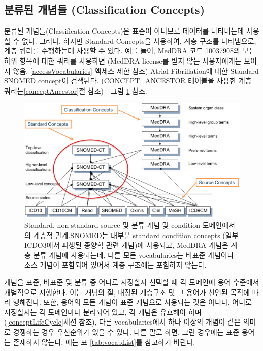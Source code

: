 \documentclass[11pt]{book}
\theoremstyle{definition}
\theoremstyle{definition}
\theoremstyle{definition}
\theoremstyle{remark}
\begin{document}
\subsection{분류된 개념들 (Classification
Concepts)}\label{--classification-concepts}

분류된 개념들(Classification Concepts)은 표준이 아니므로 데이터를
나타내는데 사용할 수 없다. 그러나, 하지만 Standard Concepts을 사용하여,
계층 구조를 나타냄으로, 계층 쿼리를 수행하는데 사용할 수 있다. 예를
들어, MedDRA 코드 10037908의 모든 하위 항목에 대한 쿼리를 사용하면
(MedDRA license를 받지 않는 사용자에게는 보이지 않음,
\ref{accessVocabularies} 액세스 제한 참조) Atrial Fibrillation에 대한
Standard SNOMED concept이 검색된다. (CONCEPT\_ANCESTOR 테이블을 사용한
계층 쿼리는\ref{conceptAncestor}절 참조) - 그림 \ref{fig:hierarchy}
참조. 

\begin{figure}

{\centering \includegraphics[width=1\linewidth]{images/StandardizedVocabularies/hierarchy} 

}

\caption{Standard, non-standard source 및 분류 개념 및 condition 도메인에서의 계층적 관계.SNOMED는 대부분 standard condition concepts (일부 ICDO3에서 파생된 종양학 관련 개념)에 사용되고, MedDRA 개념은 계층 분류 개념에 사용되는데, 다른 모든 vocabularies는 비표준 개념이나 소스 개념이 포함되어 있어서 계층 구조에는 포함하지 않는다.}\label{fig:hierarchy}
\end{figure}

개념을 표준, 비표준 및 분류 중 어디로 지정할지 선택할 때 각 도메인에
용어 수준에서 개별적으로 시행한다. 이는 개념의 질, 내장된 계층구조 및 그
용어가 선언된 목적에 따라 행해진다. 또한, 용어의 모든 개념이 표준
개념으로 사용되는 것은 아니다. 어디로 지정할지는 각 도메인마다 분리되어
있고, 각 개념은 유효해야 하며 (\ref{conceptLifeCycle}세션 참조), 다른
vocabularies에서 하나 이상의 개념이 같은 의미로 경쟁하는 경우 우선순위가
있을 수 있다. 다른 말로 하면, 그런 경우에는 표준 용어는 존재하지 않는다.
예는 표 \ref{tab:vocabList}를 참고하기 바란다.
\end{document}
